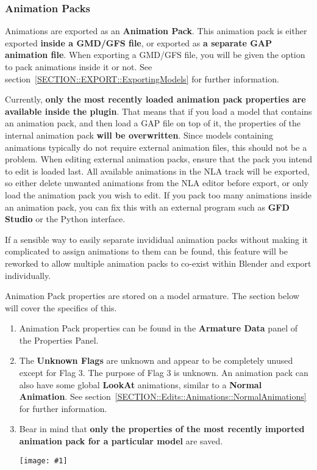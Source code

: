 \documentclass{article}
\newenvironment{guide}[1]
{
	\begin{center}
		\begin{tcolorbox}[%
			colback=black!20, 
			boxrule=0pt, 
			title=Step-by-step: #1,
			enhanced,
			breakable,
			overlay unbroken={%
                \draw[line width=1pt, black, rounded corners]
        	    (frame.north west) rectangle (frame.south east);
			},
    		overlay first={%
        		 \draw[line width=1pt, black, rounded corners]
        	    (frame.south west) -- (frame.north west) -- (frame.north east) -- (frame.south east);
                \draw[line width=1pt, black]
                (frame.south west) -- (frame.south east);
            },
    		overlay middle={%
                \draw[line width=1pt, black]
        	    (frame.north west) rectangle (frame.south east);
        	},
    		overlay last={%
                \draw[line width=1pt, black, rounded corners]
        	    (frame.north west) -- (frame.south west) -- (frame.south east) -- (frame.north east);
                \draw[line width=1pt, black]
                (frame.north west) -- (frame.north east);
           	}
        ]{}
    	\begin{enumerate}
}
{
    		\end{enumerate}
    	\end{tcolorbox}
	\end{center}  	 
}
\newcommand{\guideimage}[1]
{
	\begin{center}
		\texttt{[image: \#1]}
	\end{center}
}
\begin{document}
\subsubsection{Animation Packs}
\label{SECTION::Edits::Animations::AnimationPacks}
Animations are exported as an \textbf{Animation Pack}. This animation pack is either exported \textbf{inside a GMD/GFS file}, or exported as \textbf{a separate GAP animation file}. When exporting a GMD/GFS file, you will be given the option to pack animations inside it or not. See section~\ref{SECTION::EXPORT::ExportingModels} for further information.

Currently, \textbf{only the most recently loaded animation pack properties are available inside the plugin}. That means that if you load a model that contains an animation pack, and then load a GAP file on top of it, the properties of the internal animation pack \textbf{will be overwritten}. Since models containing animations typically do not require external animation files, this should not be a problem. When editing external animation packs, ensure that the pack you intend to edit is loaded last. All available animations in the NLA track will be exported, so either delete unwanted animations from the NLA editor before export, or only load the animation pack you wish to edit. If you pack too many animations inside an animation pack, you can fix this with an external program such as \textbf{GFD Studio} or the Python interface.

If a sensible way to easily separate invididual animation packs without making it complicated to assign animations to them can be found, this feature will be reworked to allow multiple animation packs to co-exist within Blender and export individually.

Animation Pack properties are stored on a model armature. The section below will cover the specifics of this.
\begin{guide}{Accessing Animation Pack Properties}
\item Animation Pack properties can be found in the \textbf{Armature Data} panel of the Properties Panel.
\item The \textbf{Unknown Flags} are unknown and appear to be completely unused except for Flag 3. The purpose of Flag 3 is unknown. An animation pack can also have some global \textbf{LookAt} animations, similar to a \textbf{Normal Animation}. See section~\ref{SECTION::Edits::Animations::NormalAnimations} for further information.
\item Bear in mind that \textbf{only the properties of the most recently imported animation pack for a particular model} are saved.
\guideimage{images/editing_models/edits_animation_pack.png}
\end{guide}
\end{document}

